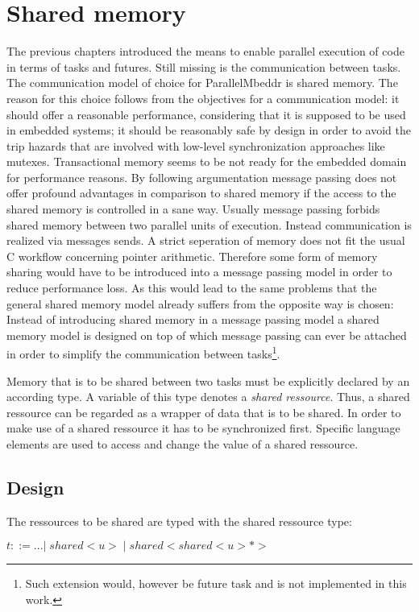 \section{Shared memory}
The previous chapters introduced the means to enable parallel execution of code in terms of tasks and futures. Still missing is the communication between tasks. The communication model of choice for ParallelMbeddr is shared memory. The reason for this choice follows from the objectives for a communication model: it should offer a reasonable performance, considering that it is supposed to be used in embedded systems; it should be reasonably safe by design in order to avoid the trip hazards that are involved with low-level synchronization approaches like mutexes. Transactional memory seems to be not ready for the embedded domain for performance reasons. By following argumentation message passing does not offer profound advantages in comparison to shared memory if the access to the shared memory is controlled in a sane way. Usually message passing forbids shared memory between two parallel units of execution. Instead communication is realized via messages sends. A strict seperation of memory does not fit the usual C workflow concerning pointer arithmetic. Therefore some form of memory sharing would have to be introduced into a message passing model in order to reduce performance loss. As this would lead to the same problems that the general shared memory model already suffers from the opposite way is chosen: Instead of introducing shared memory in a message passing model a shared memory model is designed on top of which message passing can ever be attached in order to simplify the communication between tasks\footnote{Such extension would, however be future task and is not implemented in this work.}.

Memory that is to be shared between two tasks must be explicitly declared by an according type. A variable of this type denotes a \textit{shared ressource}. Thus, a shared ressource can be regarded as a wrapper of data that is to be shared. In order to make use of a shared ressource it has to be synchronized first. Specific language elements are used to access and change the value of a shared ressource.

\subsection{Design}
The ressources to be shared are typed with the shared ressource type:

$ t ::= ...|\;\mathit{shared{<}u{>}}\;|\;\mathit{shared{<}shared{<}u{>}{*}{>}}\;$

